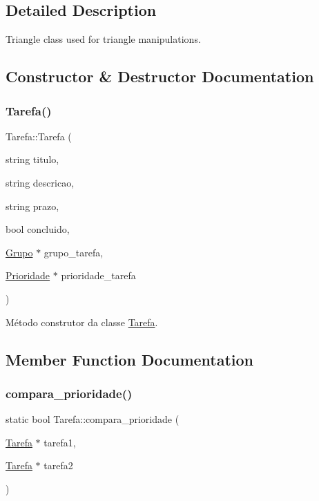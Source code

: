 \subsection{Detailed Description}
Triangle class used for triangle manipulations. 

\subsection{Constructor \& Destructor Documentation}
\mbox{\label{classTarefa_a6567c607df9f7dca0d23f82d9e20c7fa}} 
\subsubsection{\texorpdfstring{Tarefa()}{Tarefa()}}
{\footnotesize\ttfamily Tarefa\+::\+Tarefa (\begin{DoxyParamCaption}\item[{string}]{titulo,  }\item[{string}]{descricao,  }\item[{string}]{prazo,  }\item[{bool}]{concluido,  }\item[{\hyperlink{classGrupo}{Grupo} $\ast$}]{grupo\+\_\+tarefa,  }\item[{\hyperlink{classPrioridade}{Prioridade} $\ast$}]{prioridade\+\_\+tarefa }\end{DoxyParamCaption})}



Método construtor da classe \hyperlink{classTarefa}{Tarefa}. 



\subsection{Member Function Documentation}
\mbox{\label{classTarefa_aced2ea3f6ece755a69d49d58a8f51bbf}} 
\subsubsection{\texorpdfstring{compara\+\_\+prioridade()}{compara\_prioridade()}}
{\footnotesize\ttfamily static bool Tarefa\+::compara\+\_\+prioridade (\begin{DoxyParamCaption}\item[{\hyperlink{classTarefa}{Tarefa} $\ast$}]{tarefa1,  }\item[{\hyperlink{classTarefa}{Tarefa} $\ast$}]{tarefa2 }\end{DoxyParamCaption})\hspace{0.3cm}{\ttfamily [static]}}

